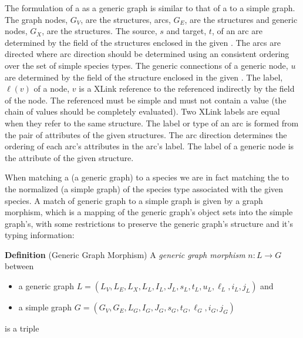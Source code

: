 \documentclass{cekarticle}
\begin{document}
The formulation of a  as a generic
graph is similar to that of a  to a simple
graph. The graph nodes, $G_{V}$, are the
 structures, arcs, $G_{E}$, are the
 structures and generic nodes, $G_{X}$, are
the  structures.  The source, $s$ and target,
$t$, of an arc are determined by the 
field of the  structures enclosed in
the given .  The arcs are directed where arc
direction should be determined using an consistent ordering over
the set of simple species types. The generic connections of a
generic node, $u$ are determined by the
 field of the
 structure enclosed in the given
. The label, $\ell(v)$ of a node, $v$ is a
XLink reference to the  referenced indirectly
by the  field of the node.  The referenced
 must be simple and must not contain a
 value (the chain of  values should be
completely evaluated).  Two XLink labels are equal when they refer
to the same  structure.  The label or type of
an arc is formed from the pair of  attributes
of the given  structures. The arc direction
determines the ordering of each arc's 
attributes in the arc's label. The label of a generic node is the
 attribute of the given 
structure.

When matching a  (a generic graph)
to a species we are in fact matching the
 to the normalized
 (a simple graph) of the species type
associated with the given species.  A match of generic graph to a
simple graph is given by a graph morphism, which is a mapping of
the generic graph's object sets into the simple graph's, with some
restrictions to preserve the generic graph's structure and it's
typing information:

\textbf{Definition} (Generic Graph Morphism) A \emph{generic graph
morphism} $n : L \rightarrow G$ between
\begin{itemize}
\item a generic graph $L = (L_{V}, L_{E}, L_{X}, L_{L}, I_{L},
J_{L}, s_{L}, t_{L}, u_{L}, \ell_{L}, i_{L}, j_{L})$ and

\item a simple graph $G = (G_{V}, G_{E}, L_{G}, I_{G}, J_{G},
s_{G}, t_{G}, \ell_{G}, i_{G}, j_{G})$
\end{itemize}
is a triple
\end{document}

